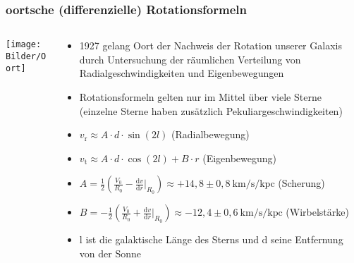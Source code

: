 \documentclass{beamer}
\begin{document}
\begin{frame}\frametitle{oortsche (differenzielle) Rotationsformeln}

\begin{columns}

\begin{column}{.48\textwidth}

\texttt{[image: Bilder/Oort]}

\end{column}

\hfill

\begin{column}{.48\textwidth}

\begin{itemize}
\tiny
\item 1927 gelang Oort der Nachweis der Rotation unserer Galaxis durch Untersuchung der räumlichen Verteilung von Radialgeschwindigkeiten und Eigenbewegungen
\item Rotationsformeln gelten nur im Mittel über viele Sterne (einzelne Sterne haben zusätzlich Pekuliargeschwindigkeiten)
\item $ v_\text{r} \approx A\cdot d\cdot \sin(2l) $ (Radialbewegung)
\item $ v_\text{t} \approx A\cdot d\cdot \cos(2l) + B\cdot r $ (Eigenbewegung)
\item $ A =  \frac{1}{2}\left(\frac{V_{0}}{R_{0}}-\frac{\mathrm dv}{\mathrm dr}\Big|_{R_{0}}\right) \approx +14{,}8 \pm 0{,}8 \ \mathrm{km/s/kpc} $ (Scherung)
\item $ B = -\frac{1}{2}\left(\frac{V_{0}}{R_{0}}+\frac{\mathrm dv}{\mathrm dr}\Big|_{R_{0}}\right) \approx -12{,}4 \pm 0{,}6 \ \mathrm{km/s/kpc} $ (Wirbelstärke)
\item l ist die \glqq galaktische Länge des Sterns und d seine Entfernung von der Sonne
\end{itemize}

\end{column}

\end{columns}

\end{frame}
\end{document}
